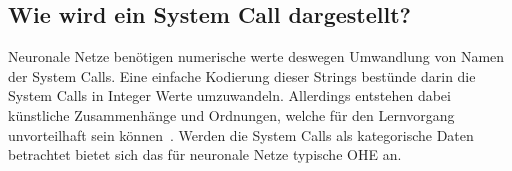 
        \subsection{Wie wird ein System Call dargestellt?}\label{sec:syscalldarstellung}
            Neuronale Netze benötigen numerische werte deswegen Umwandlung von Namen der System Calls. 
            Eine einfache Kodierung dieser Strings bestünde darin die System Calls in Integer Werte umzuwandeln.
            Allerdings entstehen dabei künstliche Zusammenhänge und Ordnungen, welche für den Lernvorgang unvorteilhaft sein können~\cite{NEURALBISHOP1995}.
            Werden die System Calls als kategorische Daten betrachtet bietet sich das für neuronale Netze typische \ac{OHE} an.
